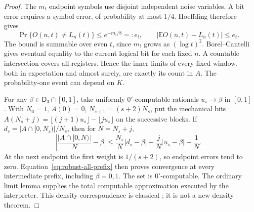 \begin{proof}
The $m_t$ endpoint symbols use disjoint independent noise variables.
A bit error requires a symbol error, of probability at most $1/4$.
Hoeffding therefore gives
\begin{equation}\label{eq:robust-amplification}
 \Pr\{O(n,t)\ne L_n(t)\}\leq e^{-m_t/8}=:e_t,
 \qquad |\mathbb E O(n,t)-L_n(t)|\leq e_t.
\end{equation}
The bound is summable over even $t$, since $m_t$ grows as
$(\log t)^2$. Borel--Cantelli gives eventual equality to the current
logical bit for each fixed $n$. A countable intersection covers all
registers. Hence the inner limits of every fixed window, both in
expectation and almost surely, are exactly its count in $A$.
The probability-one event can depend on $K$.

For any $\beta\in\mathsf D_3\cap[0,1]$, take uniformly
$0'$-computable rationals $u_s\to\beta$ in $[0,1]$. With
$N_0=1$, $A(0)=0$, $N_{s+1}=(s+2)N_s$, put the mechanical bits
$A(N_s+j)=\lfloor(j+1)u_s\rfloor-\lfloor ju_s\rfloor$ on the
successive blocks. If $d_s=|A\cap[0,N_s)|/N_s$, then for
$N=N_s+j$,
\begin{equation}\label{eq:robust-all-prefix}
 \left|\frac{|A\cap[0,N)|}{N}-\beta\right|
 \leq\frac{N_s}{N}|d_s-\beta|
      +\frac jN|u_s-\beta|+\frac1N.
\end{equation}
At the next endpoint the first weight is $1/(s+2)$, so endpoint
errors tend to zero. Equation~\eqref{eq:robust-all-prefix} then
proves convergence at every intermediate prefix, including
$\beta=0,1$. The set is $0'$-computable. The ordinary limit lemma
supplies the total computable approximation executed by the interpreter.
This density correspondence is classical
\cite{density,ershovDensity}; it is not a new density theorem.


\end{proof}
